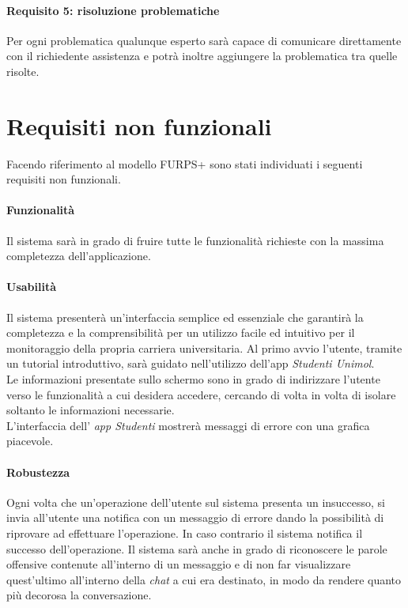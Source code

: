 \paragraph{Requisito 5: risoluzione problematiche\\}
Per ogni problematica qualunque esperto sarà capace di comunicare direttamente con il richiedente assistenza e potrà inoltre aggiungere la problematica tra quelle risolte. 


\section{Requisiti non funzionali}

Facendo riferimento al modello FURPS+ sono stati individuati i seguenti requisiti
non funzionali.

\paragraph{Funzionalità\\} 
Il sistema sarà in grado di fruire tutte le funzionalità richieste con la massima completezza dell’applicazione.

\paragraph{Usabilità\\} 
Il sistema presenterà un’interfaccia semplice ed essenziale che garantirà la completezza e la comprensibilità per un utilizzo facile ed intuitivo per il monitoraggio della propria carriera universitaria. Al primo avvio l’utente, tramite un tutorial introduttivo, sarà guidato nell’utilizzo dell’app \emph{Studenti Unimol}.\\ 
Le informazioni presentate sullo schermo sono in grado di indirizzare l’utente verso le funzionalità a cui desidera accedere, cercando di volta in volta di isolare soltanto le informazioni necessarie.\\
L'interfaccia dell' \textit{app Studenti} mostrerà messaggi di errore con una grafica piacevole.

\paragraph{Robustezza\\} 
Ogni volta che un’operazione dell’utente sul sistema presenta un insuccesso, si invia all’utente una notifica con un messaggio di errore dando la possibilità di riprovare ad effettuare l’operazione. In caso contrario il sistema notifica il successo dell’operazione. 
Il sistema sarà anche in grado di riconoscere le parole offensive contenute all’interno di un messaggio e di non far visualizzare quest’ultimo all’interno della \emph{chat} a cui era destinato, in modo da rendere quanto più decorosa la conversazione. 

